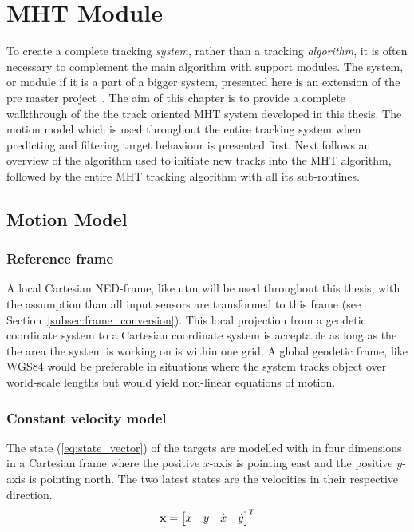 
\chapter{MHT Module}\label{chapter:mht-module}
To create a complete tracking \emph{system}, rather than a tracking \emph{algorithm}, it is often necessary  to complement the main algorithm with support modules. The system, or module if it is a part of a bigger system, presented here is an extension of the pre master project~\cite{Liland_2017}. The aim of this chapter is to provide a complete walkthrough of the the track oriented MHT system developed in this thesis. The motion model which is used throughout the entire tracking system when predicting and filtering target behaviour is presented first. Next follows an overview of the algorithm used to initiate new tracks into the MHT algorithm, followed by the entire MHT tracking algorithm with all its sub-routines.

\section{Motion Model}\label{sec:motion-model}
\subsection{Reference frame}
A local Cartesian NED-frame, like \gls{utm} will be used throughout this thesis, with the assumption than all input sensors are transformed to this frame (see Section~\ref{subsec:frame_conversion}). This local projection from a geodetic coordinate system to a Cartesian coordinate system is acceptable as long as the the area the system is working on is within one grid. A global geodetic frame, like WGS84 would be preferable in situations where the system tracks object over world-scale lengths but would yield non-linear equations of motion.

\subsection{Constant velocity model}
The state (\ref{eq:state_vector}) of the targets are modelled with in four dimensions in a Cartesian frame where the positive \(x\)-axis is pointing east and the positive \(y\)-axis is pointing north. The two latest states are the velocities in their respective direction.
\begin{equation}
\boldsymbol{\mathbf{x}} = \begin{bmatrix}
x & y & \dot{x} & \dot{y}
\end{bmatrix}^T
\label{eq:state_vector}
\end{equation}

